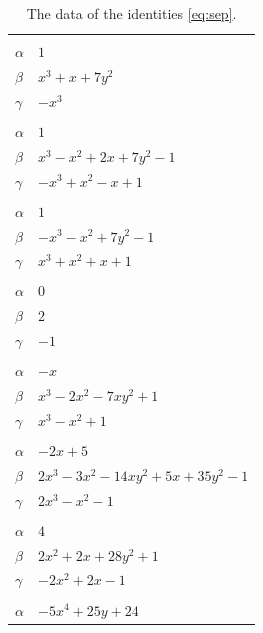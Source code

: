 \documentclass[11pt]{article}
\begin{document}
\begingroup\footnotesize
\setlength{\LTcapwidth}{\textwidth}
\begin{longtable}{@{}ll@{}}
\caption{The data of the identities \eqref{eq:sep}.}\label{tab:sep}\\
\hline\endfirsthead\hline\endhead\hline\endfoot
\multicolumn{2}{@{}l}{$\{i,j\}=\{0,1\}$, $k_{ij}=1$}\\
$\alpha$ & $1$\\
$\beta$ & $x^{3}+x+7y^{2}$\\
$\gamma$ & $-x^{3}$\\
\addlinespace[3pt]
\multicolumn{2}{@{}l}{$\{i,j\}=\{0,5\}$, $k_{ij}=2$}\\
$\alpha$ & $1$\\
$\beta$ & $x^{3}-x^{2}+2x+7y^{2}-1$\\
$\gamma$ & $-x^{3}+x^{2}-x+1$\\
\addlinespace[3pt]
\multicolumn{2}{@{}l}{$\{i,j\}=\{0,6\}$, $k_{ij}=2$}\\
$\alpha$ & $1$\\
$\beta$ & $-x^{3}-x^{2}+7y^{2}-1$\\
$\gamma$ & $x^{3}+x^{2}+x+1$\\
\addlinespace[3pt]
\multicolumn{2}{@{}l}{$\{i,j\}=\{0,9\}$, $k_{ij}=1$}\\
$\alpha$ & $0$\\
$\beta$ & $2$\\
$\gamma$ & $-1$\\
\addlinespace[3pt]
\multicolumn{2}{@{}l}{$\{i,j\}=\{0,12\}$, $k_{ij}=1$}\\
$\alpha$ & $-x$\\
$\beta$ & $x^{3}-2x^{2}-7xy^{2}+1$\\
$\gamma$ & $x^{3}-x^{2}+1$\\
\addlinespace[3pt]
\multicolumn{2}{@{}l}{$\{i,j\}=\{0,16\}$, $k_{ij}=2\cdot 3$}\\
$\alpha$ & $-2x+5$\\
$\beta$ & $2x^{3}-3x^{2}-14xy^{2}+5x+35y^{2}-1$\\
$\gamma$ & $2x^{3}-x^{2}-1$\\
\addlinespace[3pt]
\multicolumn{2}{@{}l}{$\{i,j\}=\{0,18\}$, $k_{ij}=3$}\\
$\alpha$ & $4$\\
$\beta$ & $2x^{2}+2x+28y^{2}+1$\\
$\gamma$ & $-2x^{2}+2x-1$\\
\addlinespace[3pt]
\multicolumn{2}{@{}l}{$\{i,j\}=\{1,2\}$, $k_{ij}=2^{3}\cdot 3$}\\
$\alpha$ & $-5x^{4}+25y+24$\\

\end{longtable}
\end{document}
